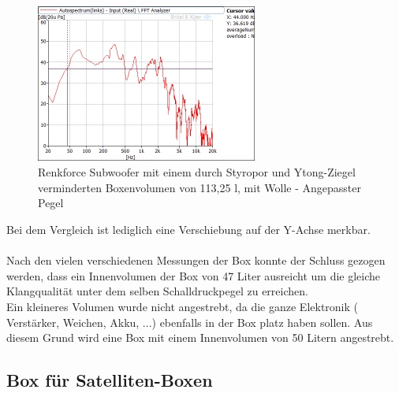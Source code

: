 \begin{figure} [H]
\centering
\includegraphics[width=0.65\textwidth]{img/Optimierung/Sub/RenkforceStyro_113l_Wolle_Angepasst.png}
\caption{Renkforce Subwoofer mit einem durch Styropor und Ytong-Ziegel verminderten Boxenvolumen von 113,25 l, mit Wolle - Angepasster Pegel}
\label{fig:4.4.2.6}
\end{figure}
Bei dem Vergleich ist lediglich eine Verschiebung auf der Y-Achse merkbar.\\ \\

Nach den vielen verschiedenen Messungen der Box konnte der Schluss gezogen werden, dass ein Innenvolumen der Box von 47 Liter ausreicht um die gleiche Klangqualität unter dem selben Schalldruckpegel zu erreichen.\\
Ein kleineres Volumen wurde nicht angestrebt, da die ganze Elektronik ( Verstärker, Weichen, Akku, ...) ebenfalls in der Box platz haben sollen.
Aus diesem Grund wird eine Box mit einem Innenvolumen von 50 Litern angestrebt.



\subsection{Box für Satelliten-Boxen}\label{subsec:4.4.3}